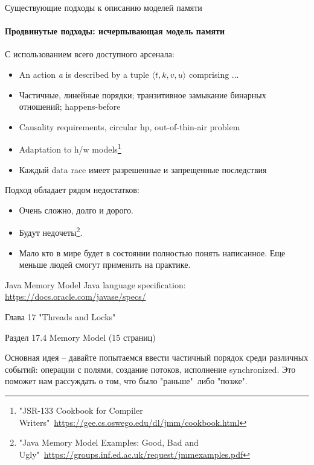 \begin{frame}{Существующие подходы к описанию моделей памяти}
\framesubtitle{Продвинутые подходы: исчерпывающая модель памяти}

\pause
С использованием всего доступного арсенала: 
\begin{itemize}
	\pause
	\item An action \textit{a} is described by a tuple $\langle t, k, v, u\rangle$ comprising ...\
	\pause
	\item Частичные, линейные порядки; транзитивное замыкание бинарных отношений; happens-before
	\pause
	\item Causality requirements, circular hp, out-of-thin-air problem
	\pause
	\item Adaptation to h/w models\footnote<6->{\tiny"JSR-133 Cookbook for Compiler Writers"\ \url{https://gee.cs.oswego.edu/dl/jmm/cookbook.html}}
	\pause
	\item Каждый data race имеет разрешенные и запрещенные последствия
\end{itemize}

\pause
Подход обладает рядом недостатков:
\begin{itemize}
	\item Очень сложно, долго и дорого.
	\item Будут недочеты\footnote<8->{\tiny"Java Memory Model Examples: Good, Bad and Ugly"\ \url{https://groups.inf.ed.ac.uk/request/jmmexamples.pdf}}.
	\item Мало кто в мире будет в состоянии полностью понять написанное. Еще меньше людей смогут применить на практике.
\end{itemize}
\end{frame}


\begin{frame}[t]{Java Memory Model}
Java language specification: \url{https://docs.oracle.com/javase/specs/}

\pause
Глава 17 "Threads and Locks"

\pause
Раздел 17.4 Memory Model (15 страниц)

\pause
Основная идея -- давайте попытаемся ввести частичный порядок среди различных событий: операции с полями, создание потоков, исполнение synchronized.
Это поможет нам рассуждать о том, что было "раньше"\ либо "позже".

\end{frame}



